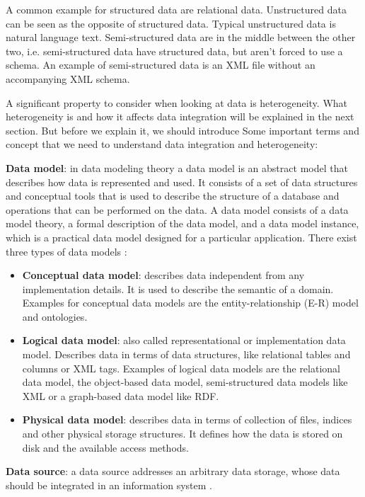 A common example for structured data are relational data. Unstructured data can be seen as the opposite of structured data. Typical unstructured data is natural language text. Semi-structured data are in the middle between the other two, i.e. semi-structured data have structured data, but aren't forced to use a schema. An example of semi-structured data is an XML file without an accompanying XML schema.

A significant property to consider when looking at data is heterogeneity. What heterogeneity is and how it affects data integration will be explained in the next section. But before we explain it, we should introduce Some important terms and concept that we need to understand data integration and heterogeneity:

\textbf{Data model}: \label{data_model_index} in data modeling theory a data model is an abstract model that describes how data is represented and used. It consists of a set of data structures and conceptual tools that is used to describe the structure of a database and operations that can be performed on the data. A data model consists of a data model theory, a formal description of the data model, and a data model instance, which is a practical data model designed for a particular application. There exist three types of data models \cite[p.10-14]{IntroductionToDatabaseSystems2010}:
\begin{itemize}
	\item \textbf{Conceptual data model}: describes data independent from any implementation details. It is used to describe the semantic of a domain. Examples for conceptual data models are the entity-relationship (E-R) model and ontologies. 
	\item \textbf{Logical data model}: also called representational or implementation data model. Describes data in terms of data structures, like relational tables and columns or XML tags. Examples of logical data models are the relational data model, the object-based data model, semi-structured data models like XML or a graph-based data model like RDF. 
	\item \textbf{Physical data model}: describes data in terms of collection of files, indices and other physical storage structures. It defines how the data is stored on disk and the available access methods. 
\end{itemize}

\textbf{Data source}:\label{data_source_index} a data source addresses an arbitrary data storage, whose data should be integrated in an information system \cite[p. 7]{DBLP:books/dp/LeserN2006}.

